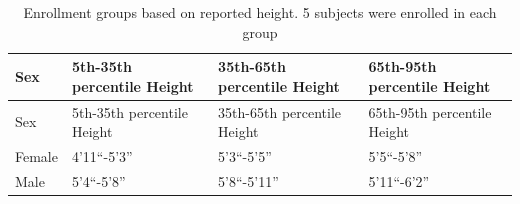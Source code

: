 \documentclass[defaultstyle,11pt]{comps}
\begin{document}
\hypertarget{tbl:groups}{}
\begin{longtable}[]{@{}llll@{}}
\caption{\label{tbl:groups}Enrollment groups based on reported height. 5 subjects were enrolled in each group}\tabularnewline
\toprule
\begin{minipage}[b]{0.06\columnwidth}\raggedright
Sex\strut
\end{minipage} & \begin{minipage}[b]{0.27\columnwidth}\raggedright
5th-35th percentile Height\strut
\end{minipage} & \begin{minipage}[b]{0.28\columnwidth}\raggedright
35th-65th percentile Height\strut
\end{minipage} & \begin{minipage}[b]{0.28\columnwidth}\raggedright
65th-95th percentile Height\strut
\end{minipage}\tabularnewline
\midrule
\endfirsthead
\toprule
\begin{minipage}[b]{0.06\columnwidth}\raggedright
Sex\strut
\end{minipage} & \begin{minipage}[b]{0.27\columnwidth}\raggedright
5th-35th percentile Height\strut
\end{minipage} & \begin{minipage}[b]{0.28\columnwidth}\raggedright
35th-65th percentile Height\strut
\end{minipage} & \begin{minipage}[b]{0.28\columnwidth}\raggedright
65th-95th percentile Height\strut
\end{minipage}\tabularnewline
\midrule
\endhead
\begin{minipage}[t]{0.06\columnwidth}\raggedright
Female\strut
\end{minipage} & \begin{minipage}[t]{0.27\columnwidth}\raggedright
4'11``-5'3''\strut
\end{minipage} & \begin{minipage}[t]{0.28\columnwidth}\raggedright
5'3``-5'5''\strut
\end{minipage} & \begin{minipage}[t]{0.28\columnwidth}\raggedright
5'5``-5'8''\strut
\end{minipage}\tabularnewline
\begin{minipage}[t]{0.06\columnwidth}\raggedright
Male\strut
\end{minipage} & \begin{minipage}[t]{0.27\columnwidth}\raggedright
5'4``-5'8''\strut
\end{minipage} & \begin{minipage}[t]{0.28\columnwidth}\raggedright
5'8``-5'11''\strut
\end{minipage} & \begin{minipage}[t]{0.28\columnwidth}\raggedright
5'11``-6'2''\strut
\end{minipage}\tabularnewline
\bottomrule
\end{longtable}
\end{document}
